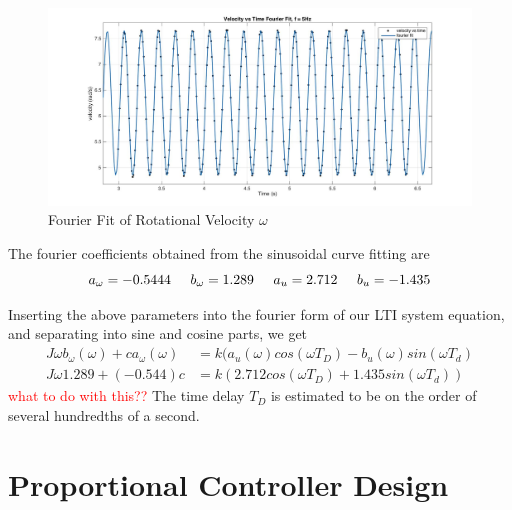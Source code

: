 \documentclass[11pt,titlepage]{article}
\begin{document}
	\begin{figure}[h!]
		\centering
		\includegraphics[trim={6cm 0 0 0},clip,angle=0,origin=c,scale=0.3]{fourier_vel_5Hz}
		\caption{Fourier Fit of Rotational Velocity $\omega$}
		\label{fig:fourier_vel_5Hz}
	\end{figure}
	
	The fourier coefficients obtained from the sinusoidal curve fitting are
	\begin{equation}
		a_{\omega}=-0.5444\hspace{0.5cm}b_{\omega}=1.289\hspace{0.5cm}a_u=2.712\hspace{0.5cm}b_u=-1.435\nonumber
	\end{equation}
	
	Inserting the above parameters into the fourier form of our LTI system equation, and separating into sine and cosine parts, we get
	\begin{align}
		J\omega b_{\omega}(\omega)+ca_{\omega}(\omega)&=k(a_u(\omega)cos(\omega T_D)-b_u(\omega)sin(\omega T_d)\\
		J\omega 1.289+(-0.544)c&=k(2.712cos(\omega T_D)+1.435sin(\omega T_d))
	\end{align}
	\textcolor{red}{what to do with this??}
	The time delay $T_D$ is estimated to be on the order of several hundredths of a second. 
\section{Proportional Controller Design}
\end{document}
